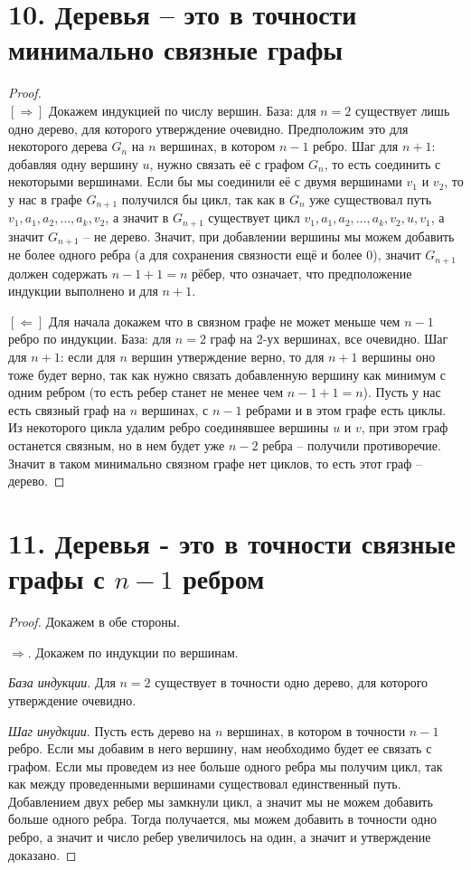 \documentclass[a4paper,12pt]{article}
\begin{document}
    \section*{10. Деревья -- это в точности минимально связные графы}
    \begin{proof}\ \\
        $[\Rightarrow]$ Докажем индукцией по числу вершин. База: для $n = 2$ существует лишь одно дерево, для которого утверждение очевидно. Предположим это для некоторого дерева $G_{n}$ на $n$ вершинах, в котором $n - 1$ ребро. Шаг для $n + 1$: добавляя одну вершину $u$, нужно связать её с графом $G_{n}$, то есть соединить с некоторыми вершинами. Если бы мы соединили её с двумя вершинами $v_{1}$ и $v_{2}$, то у нас в графе $G_{n+1}$ получился бы цикл, так как в $G_{n}$ уже существовал путь $v_{1}, a_{1}, a_{2},\ldots, a_{k}, v_{2}$, а значит в $G_{n+1}$ существует цикл $v_{1}, a_{1}, a_{2},\ldots, a_{k}, v_{2}, u, v_{1}$, а значит $G_{n+1}$ -- не дерево. Значит, при добавлении вершины мы можем добавить не более одного ребра (а для сохранения связности ещё и более 0), значит $G_{n+1}$ должен содержать $n - 1 + 1 = n$ рёбер, что означает, что предположение индукции выполнено и для $n + 1$.
        
        \noindent$[\Leftarrow]$ Для начала докажем что в связном графе не может меньше чем $n - 1$ ребро по индукции. База: для $n = 2$ граф на 2-ух вершинах, все очевидно. Шаг для $n + 1$: если для $n$ вершин утверждение верно, то для $n + 1$ вершины оно тоже будет верно, так как нужно связать добавленную вершину как минимум с одним ребром (то есть ребер станет не менее чем $n - 1 + 1 = n$). Пусть у нас есть связный граф на $n$ вершинах, с $n - 1$ ребрами и в этом графе есть циклы. Из некоторого цикла удалим ребро соединявшее вершины $u$ и $v$, при этом граф останется связным, но в нем будет уже $n - 2$ ребра -- получили противоречие. Значит в таком минимально связном графе нет циклов, то есть этот граф -- дерево.
    \end{proof}

	\section*{11. Деревья - это в точности связные графы с $n - 1$ ребром}
	\begin{proof}
		Докажем в обе стороны.
		
		$\Rightarrow$. Докажем по индукции по вершинам.
		
		\textit{База индукции}. Для $n = 2$ существует в точности одно дерево, для которого утверждение очевидно.
		
		\textit{Шаг инудкции}. Пусть есть дерево на $n$ вершинах, в котором в точности $n - 1$ ребро. Если мы добавим в него вершину, нам необходимо будет ее связать с графом. Если мы проведем из нее больше одного ребра мы получим цикл, так как между проведенными вершинами существовал единственный путь. Добавлением двух ребер мы замкнули цикл, а значит мы не можем добавить больше одного ребра. Тогда получается, мы можем добавить в точности одно ребро, а значит и число ребер увеличилось на один, а значит и утверждение доказано.
		
		
	\end{proof}
	
\end{document}
